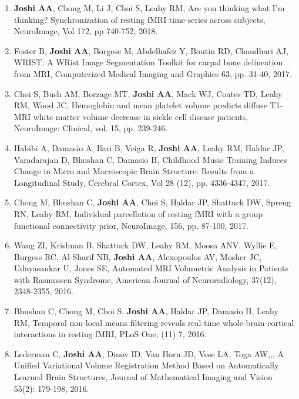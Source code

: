 \documentclass[overlapped,line,letterpaper]{res}
\begin{document}
\begin{resume}
\begin{enumerate}
    \item \textbf{Joshi AA}, Chong M, Li J, Choi S, Leahy RM, {Are you thinking what I'm thinking? Synchronization of resting fMRI time-series across subjects}, {NeuroImage}, Vol 172, pp 740-752, 2018.

    \item Foster B, \textbf{Joshi AA}, Borgese M, Abdelhafez Y, Boutin RD, Chaudhari AJ, {WRIST: A WRist Image Segmentation Toolkit for carpal bone delineation from MRI}, Computerized Medical Imaging and Graphics 63, pp. 31-40, 2017.

    \item Choi S, Bush AM, Borzage MT, \textbf{Joshi AA}, Mack WJ, Coates TD, Leahy RM, Wood JC, {Hemoglobin and mean platelet volume predicts diffuse T1-MRI white matter volume decrease in sickle cell disease patients}, NeuroImage: Clinical, vol. 15, pp. 239-246. 

    \item Habibi A, Damasio A, Ilari B, Veiga R, \textbf{Joshi AA}, Leahy RM, Haldar JP, Varadarajan D, Bhushan C, Damasio H, Childhood Music Training Induces Change in Micro and Macroscopic Brain Structure: Results from a Longitudinal Study, Cerebral Cortex,  Vol 28 (12), pp. 4336-4347, 2017.

    \item Chong M, Bhushan C, \textbf{Joshi AA}, Choi S, Haldar JP, Shattuck DW, Spreng RN, Leahy RM, Individual parcellation of resting fMRI with a group functional connectivity prior, NeuroImage, 156, pp. 87-100, 2017. 

    \item Wang ZI, Krishnan B, Shattuck DW, Leahy RM, Moosa ANV, Wyllie E, Burgess RC, Al-Sharif NB, \textbf{Joshi AA}, Alexopoulos AV, Mosher JC, Udayasankar U, Jones SE, {Automated MRI Volumetric Analysis in Patients with Rasmussen Syndrome}, American Journal of Neuroradiology, 37(12), 2348-2355, 2016.

    \item Bhushan C, Chong M, Choi S, \textbf{Joshi AA}, Haldar JP, Damasio H, Leahy RM, {Temporal non-local means filtering reveals real-time whole-brain cortical interactions in resting fMRI}, PLoS One, (11) 7, 2016.

    \item Lederman C, \textbf{Joshi AA}, Dinov ID, Van Horn JD, Vese LA, Toga AW,,, {A Unified Variational Volume Registration Method Based on Automatically Learned Brain Structures}, Journal of Mathematical Imaging and Vision 55(2): 179-198, 2016.


\end{enumerate}
\end{resume}
\end{document}
